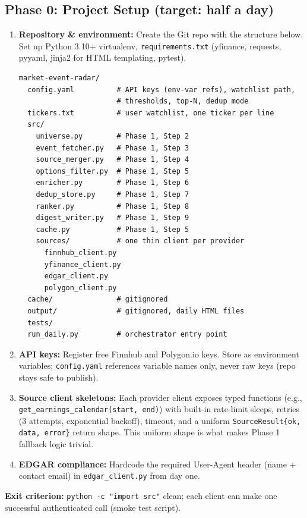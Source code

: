 \documentclass[11pt]{article}
\begin{document}
\subsection{Phase 0: Project Setup \hfill {\small (target: half a day)}}

\begin{enumerate}
  \item \textbf{Repository \& environment:} Create the Git repo with the structure below. Set up Python 3.10+ virtualenv, \texttt{requirements.txt} (yfinance, requests, pyyaml, jinja2 for HTML templating, pytest).
\begin{verbatim}
market-event-radar/
  config.yaml          # API keys (env-var refs), watchlist path,
                       # thresholds, top-N, dedup mode
  tickers.txt          # user watchlist, one ticker per line
  src/
    universe.py        # Phase 1, Step 2
    event_fetcher.py   # Phase 1, Step 3
    source_merger.py   # Phase 1, Step 4
    options_filter.py  # Phase 1, Step 5
    enricher.py        # Phase 1, Step 6
    dedup_store.py     # Phase 1, Step 7
    ranker.py          # Phase 1, Step 8
    digest_writer.py   # Phase 1, Step 9
    cache.py           # Phase 1, Step 5
    sources/           # one thin client per provider
      finnhub_client.py
      yfinance_client.py
      edgar_client.py
      polygon_client.py
  cache/               # gitignored
  output/              # gitignored, daily HTML files
  tests/
  run_daily.py         # orchestrator entry point
\end{verbatim}
  \item \textbf{API keys:} Register free Finnhub and Polygon.io keys. Store as environment variables; \texttt{config.yaml} references variable names only, never raw keys (repo stays safe to publish).
  \item \textbf{Source client skeletons:} Each provider client exposes typed functions (e.g., \texttt{get\_earnings\_calendar(start, end)}) with built-in rate-limit sleeps, retries (3 attempts, exponential backoff), timeout, and a uniform \texttt{SourceResult\{ok, data, error\}} return shape. This uniform shape is what makes Phase 1 fallback logic trivial.
  \item \textbf{EDGAR compliance:} Hardcode the required User-Agent header (name + contact email) in \texttt{edgar\_client.py} from day one.
\end{enumerate}
\textbf{Exit criterion:} \texttt{python -c "import src"} clean; each client can make one successful authenticated call (smoke test script).
\end{document}

